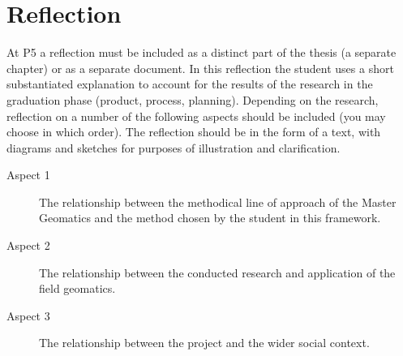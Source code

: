 

\chapter{Reflection}

At P5 a reflection must be included as a distinct part of the thesis (a separate chapter) or as a separate document.
In this reflection the student uses a short substantiated explanation to account for the results of the research in the graduation phase (product, process, planning).
Depending on the research, reflection on a number of the following aspects should be included (you may choose in which order). 
The reflection should be in the form of a text, with diagrams and sketches for purposes of illustration and clarification.

\begin{description}
  \item[Aspect 1] The relationship between the methodical line of approach of the Master Geomatics and  the method chosen by the student in this framework.  
  \item[Aspect 2] The relationship between the conducted research and application of the field  geomatics.
  \item[Aspect 3] The relationship between the project and the wider social context.
\end{description}